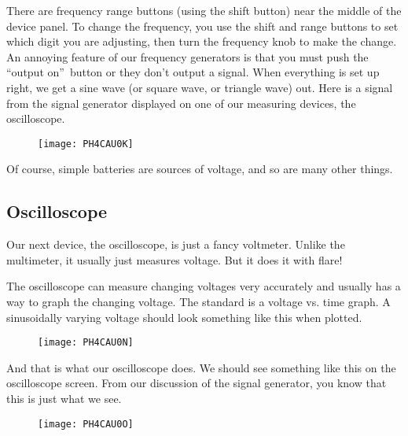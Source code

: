 There are frequency range buttons (using the shift button) near the middle
of the device panel. To change the frequency, you use the shift and range
buttons to set which digit you are adjusting, then turn the frequency knob
to make the change. An annoying feature of our frequency generators is that
you must push the \textquotedblleft output on\textquotedblright\ button or
they don't output a signal. When everything is set up right, we get a sine
wave (or square wave, or triangle wave) out. Here is a signal from the
signal generator displayed on one of our measuring devices, the
oscilloscope. \begin{figure}[h!]
\texttt{[image: PH4CAU0K]}
\end{figure}

Of course, simple batteries are sources of voltage, and so are many other
things.



\subsection{Oscilloscope}
\label{oscilly}
Our next device, the oscilloscope, is just a fancy voltmeter. Unlike the
multimeter, it usually just measures voltage. But it does it with flare!

The oscilloscope can measure changing voltages very accurately and usually
has a way to graph the changing voltage. The standard is a voltage vs. time
graph. A sinusoidally varying voltage should look something like this when
plotted. \begin{figure}[h!]
\texttt{[image: PH4CAU0N]}
\end{figure}And that is what our oscilloscope
does. We should see something like this on the oscilloscope screen. From our
discussion of the signal generator, you know that this is just what we see.%
\begin{figure}[h!]
\texttt{[image: PH4CAU0O]}
\end{figure}

